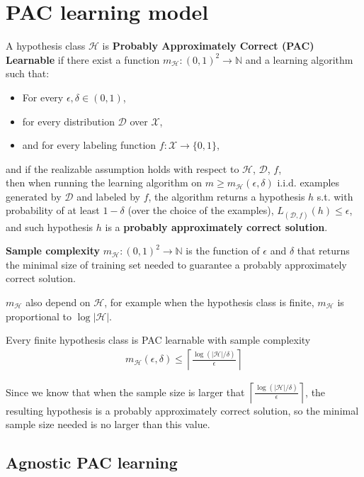 \section{PAC learning model} \label{sec:}
\begin{definition}
    A hypothesis class $\mathcal{H}$ is \textbf{Probably Approximately Correct (PAC) Learnable} if there exist a function $m_\mathcal{H}: (0,1)^{2} \to \mathbb{N}$ and a learning algorithm such that:
    \begin{itemize}
        \item For every $\epsilon, \delta \in (0,1)$,
        \item for every distribution $\mathcal{D}$ over $\mathcal{X}$,
        \item and for every labeling function $f:\mathcal{X} \to \{ 0,1 \}$,
    \end{itemize}
    and if the realizable assumption holds with respect to $\mathcal{H}$, $\mathcal{D}$, $f$,
    \\ then when running the learning algorithm on $m \ge m_\mathcal{H}(\epsilon,\delta)$ i.i.d. examples generated by $\mathcal{D}$ and labeled by $f$, the algorithm returns a hypothesis $h$ s.t. with probability of at least $1-\delta$ (over the choice of the examples), $L_{(\mathcal{D},f)}(h) \le \epsilon$, and such hypothesis $h$ is a \textbf{probably approximately correct solution}.
\end{definition}

\begin{definition}
\textbf{Sample complexity} $m_\mathcal{H}: (0,1)^{2} \to \mathbb{N}$ is the function of $\epsilon$ and $\delta$ that returns the minimal size of training set needed to guarantee a probably approximately correct solution.
\end{definition}

\begin{remark}
$m_\mathcal{H}$ also depend on $\mathcal{H}$, for example when the hypothesis class is finite, $m_\mathcal{H}$ is proportional to $\log |\mathcal{H}|$.
\end{remark}

\begin{corollary}
Every finite hypothesis class is PAC learnable with sample complexity
\begin{align*}
    m_{\mathcal{H}}(\epsilon, \delta) \le \left\lceil \frac{\log(|\mathcal{H}|/\delta)}{\epsilon} \right\rceil 
\end{align*}
\end{corollary}

\begin{intuition}
    Since we know that when the sample size is larger that $\left\lceil \frac{\log(|\mathcal{H}|/\delta)}{\epsilon} \right\rceil $, the resulting hypothesis is a probably approximately correct solution, so the minimal sample size needed is no larger than this value.
\end{intuition}

\subsection{Agnostic PAC learning} \label{sec:}
